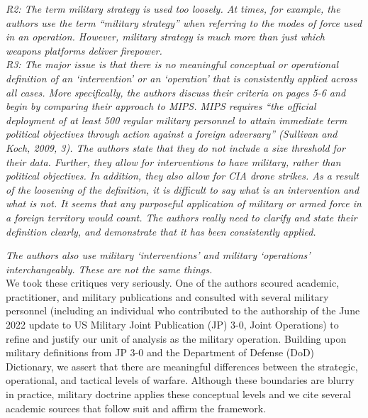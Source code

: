 \documentclass[fleqn,12pt]{article}
\begin{document}
\noindent
\textit{R2: The term military strategy is used too loosely. At times, for example, the authors use the term “military strategy” when referring to the modes of force used in an operation. However, military strategy is much more than just which weapons platforms deliver firepower.} \\

\noindent
\textit{R3: The major issue is that there is no meaningful conceptual or operational definition of an ‘intervention’ or an ‘operation’ that is consistently applied across all cases. More specifically, the authors discuss their criteria on pages 5-6 and begin by comparing their approach to MIPS. MIPS requires “the official deployment of at least 500 regular military personnel to attain immediate term political objectives through action against a foreign adversary” (Sullivan and Koch, 2009, 3). The authors state that they do not include a size threshold for their data. Further, they allow for interventions to have military, rather than political objectives. In addition, they also allow for CIA drone strikes. As a result of the loosening of the definition, it is difficult to say what is an intervention and what is not. It seems that any purposeful application of military or armed force in a foreign territory would count. The authors really need to clarify and state their definition clearly, and demonstrate that it has been consistently applied.}

\textit{The authors also use military ‘interventions’ and military ‘operations’ interchangeably. These are not the same things.} \\

We took these critiques very seriously. One of the authors scoured academic, practitioner, and military publications and consulted with several military personnel (including an individual who contributed to the authorship of the June 2022 update to US Military Joint Publication (JP) 3-0, Joint Operations) to refine and justify our unit of analysis as the military operation. Building upon military definitions from JP 3-0 and the Department of Defense (DoD) Dictionary, we assert that there are meaningful differences between the strategic, operational, and tactical levels of warfare. Although these boundaries are blurry in practice, military doctrine applies these conceptual levels and we cite several academic sources that follow suit and affirm the framework.
\end{document}
